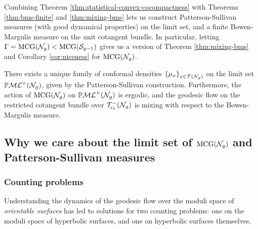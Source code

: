 Combining Theorem \ref{thm:statistical-convex-cocompactness} with Theorems \ref{thm:bms-finite} and \ref{thm:mixing-bms} lets us construct Patterson-Sullivan measures (with good dynamical properties) on the limit set, and a finite Bowen-Margulis measure on the unit cotangent bundle.
In particular, letting $\Gamma = \mathrm{MCG}(\mathcal{N}_g) < \mathrm{MCG}(\mathcal{S}_{g-1})$ gives us a version of Theorem \ref{thm:mixing-bms} and Corollary \ref{cor:niceness} for $\mathrm{MCG}(\mathcal{N}_g)$.

\begin{corollary}
  There exists a unique family of conformal densities $\left\{ \mu_x \right\}_{x \in \mathcal{T}(\mathcal{N}_g)}$ on the limit set $\mathbb{P}\mathcal{ML}^+(\mathcal{N}_g)$, given by the Patterson-Sullivan construction.
  Furthermore, the action of $\mathrm{MCG}(\mathcal{N}_g)$ on $\mathbb{P}\mathcal{ML}^+(\mathcal{N}_g)$ is ergodic, and the geodesic flow on the restricted cotangent bundle over $\mathcal{T}_{\varepsilon_t}^{-}(\mathcal{N}_g)$ is mixing with respect to the Bowen-Margulis measure.
\end{corollary}


\subsection*{Why we care about the limit set of $\mathrm{MCG}(\mathcal{N}_g)$ and Patterson-Sullivan measures}

\subsubsection*{Counting problems}

Understanding the dynamics of the geodesic flow over the moduli space of \emph{orientable surfaces} has led to solutions for two counting problems: one on the moduli space of hyperbolic surfaces, and one on hyperbolic surfaces themselves.

